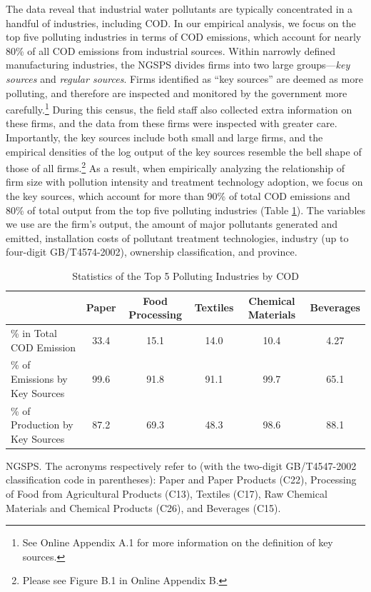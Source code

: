 \documentclass[AEJ]{AEA}
\begin{document}
The data reveal that industrial water pollutants are typically concentrated in a handful of industries, including COD. In our empirical analysis, we focus on the top five polluting industries in terms of COD emissions, which account for nearly 80\% of all COD emissions from industrial sources. Within narrowly defined manufacturing industries, the NGSPS divides firms into two large groups---\textit{key sources} and \textit{regular sources}. Firms identified as ``key sources'' are deemed as more polluting, and therefore are inspected and monitored by the government more carefully.\footnote{See Online Appendix A.1 for more information on the definition of key sources.} During this census, the field staff also collected extra information on these firms, and the data from these firms were inspected with greater care. Importantly, the key sources include both small and large firms, and the empirical densities of the log output of the key sources resemble the bell shape of those of all firms.\footnote{Please see Figure B.1 in Online Appendix B.} As a result, when empirically analyzing the relationship of firm size with pollution intensity and treatment technology adoption, we focus on the key sources, which account for more than 90\% of total COD emissions and 80\% of total output from the top five polluting industries (Table \ref{tab:top5summary}). The variables we use are the firm's output, the amount of major pollutants generated and emitted, installation costs of pollutant treatment technologies, industry (up to four-digit GB/T4574-2002), ownership classification, and province.

\begin{table}[t]
\footnotesize
\centering
\caption{Statistics of the Top 5 Polluting Industries by COD}
\begin{tabular}{lccccc}
    \hline \hline
                                       & Paper & Food Processing& Textiles  & Chemical Materials & Beverages  \\
    \hline
    \% in Total COD Emission           & 33.4  & 15.1 & 14.0 & 10.4 & 4.27  \\
    \% of Emissions by Key Sources     & 99.6  & 91.8 & 91.1 & 99.7 & 65.1  \\
    \% of Production by Key Sources    & 87.2  & 69.3 & 48.3 & 98.6 & 88.1  \\
    \hline
\end{tabular}
\begin{tablenotes}[Sources]
     NGSPS. The acronyms respectively refer to (with the two-digit GB/T4547-2002 classification code in parentheses): Paper and Paper Products (C22), Processing of Food from Agricultural Products (C13), Textiles (C17), Raw Chemical Materials and Chemical Products (C26), and Beverages (C15).
\end{tablenotes}
\label{tab:top5summary}
\end{table}
\end{document}

